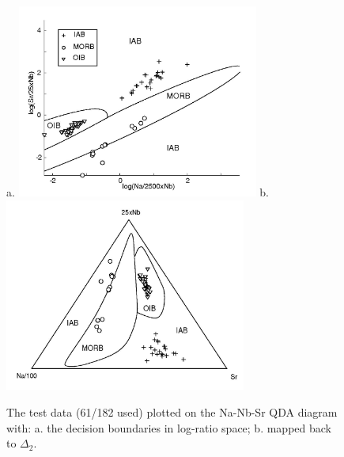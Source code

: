 \begin{figure}[htbp]
  \centering
a.  \includegraphics[width=300]{figures/log_Na_Nb_Sr_q.jpg}
b.  \includegraphics[width=300]{figures/test_Na_Nb_Sr_q.jpg}
  \caption[The test data plotted on the Na-Nb-Sr diagram]
{The test data (61/182 used) plotted on the Na-Nb-Sr QDA diagram with:
a.   the decision  boundaries in  log-ratio space;  b. mapped  back to
$\Delta_2$.}
  \label{fig:log_Na_Nb_Sr}
\end{figure}

